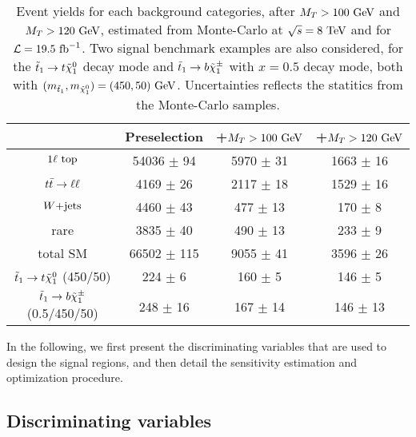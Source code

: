     \begin{table}[h!]
        \centering
        \begin{tabular}{|c|ccc|}
            \hline
                          & Preselection       & +$M_T > 100 ~\text{GeV}$   & +$M_T > 120 ~\text{GeV}$     \\
            \hline
        $1\ell~\text{top}$   & 54036 $\pm$ 94     &  5970 $\pm$ 31      &  1663 $\pm$ 16       \\
        $t\bar{t} \rightarrow \ell \ell$    &  4169 $\pm$ 26     &  2117 $\pm$ 18      &  1529 $\pm$ 16       \\
        $\text{$W$+jets}$          &  4460 $\pm$ 43     &   477 $\pm$ 13      &   170 $\pm$ 8        \\
        rare              &  3835 $\pm$ 40     &   490 $\pm$ 13      &   233 $\pm$ 9        \\
            \hline
        total SM          & 66502 $\pm$ 115    &  9055 $\pm$ 41      &  3596 $\pm$ 26       \\
            \hline
$\tilde{t}_1 \rightarrow t \tilde{\chi}_1^0$   (450/50) & 224 $\pm$ 6         & 160 $\pm$ 5   & 146 $\pm$ 5   \\
$\tilde{t}_1 \rightarrow b \tilde{\chi}_1^\pm$ (0.5/450/50) & 248 $\pm$ 16        & 167 $\pm$ 14  & 146 $\pm$ 13  \\
            \hline
        \end{tabular}
        \caption{Event yields for each background categories, after $M_T > 100
        ~\text{GeV}$ and $M_T > 120 ~\text{GeV}$, estimated from Monte-Carlo at $\sqrt{s} = 8~\text{TeV}$
        and for $\mathcal{L} = 19.5~\text{fb}^{-1}$. Two signal benchmark examples are also
        considered, for the $\tilde{t}_1 \rightarrow t \tilde{\chi}_1^0$ decay mode and $\tilde{t}_1
        \rightarrow b \tilde{\chi}_1^\pm$ with $x = 0.5$ decay mode, both with $(m_{\tilde{t}_1},m_{\tilde{\chi}_1^0})
        = (450,50)~\text{GeV}$. Uncertainties reflects the statitics from the Monte-Carlo samples.}
        \label{tab:MTcutImpact}
    \end{table}

    In the following, we first present the discriminating variables that are used to design
    the signal regions, and then detail the sensitivity estimation and optimization procedure.

    \subsection{Discriminating variables \label{sec:analysis_variables}}

